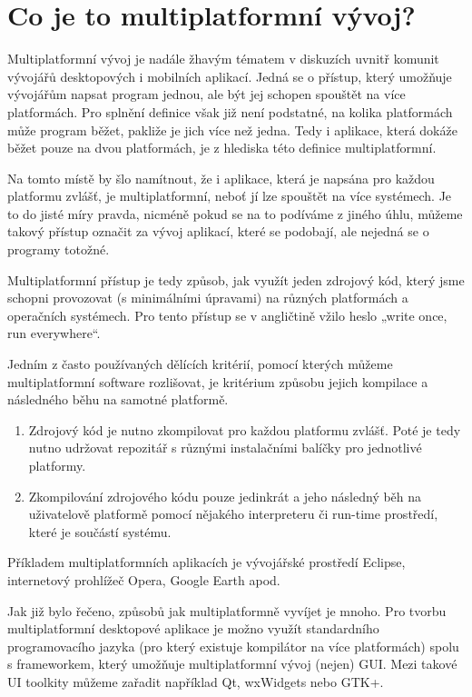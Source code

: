 \section{Co je to multiplatformní vývoj?}
Multiplatformní vývoj je nadále žhavým tématem v diskuzích uvnitř komunit vývojářů desktopových i mobilních aplikací. Jedná se o přístup, který umožňuje vývojářům napsat program jednou, ale být jej schopen spouštět na více platformách. Pro splnění definice však již není podstatné, na kolika platformách může program běžet, pakliže je jich více než jedna. Tedy i aplikace, která dokáže běžet pouze na dvou platformách, je z hlediska této definice multiplatformní.

Na tomto místě by šlo namítnout, že i aplikace, která je napsána pro každou platformu zvlášť, je multiplatformní, neboť jí lze spouštět na více systémech. Je to do jisté míry pravda, nicméně pokud se na to podíváme z jiného úhlu, můžeme takový přístup označit za vývoj aplikací, které se podobají, ale nejedná se o programy totožné.

Multiplatformní přístup je tedy způsob, jak využít jeden zdrojový kód, který jsme schopni provozovat (s minimálními úpravami) na různých platformách a operačních systémech. Pro tento přístup se v angličtině vžilo heslo „write once, run everywhere“. 

Jedním z často používaných dělících kritérií, pomocí kterých můžeme multiplatformní software rozlišovat, je kritérium způsobu jejich kompilace a následného běhu na samotné platformě.

\begin{enumerate}
	\item Zdrojový kód je nutno zkompilovat pro každou platformu zvlášť. Poté je tedy nutno udržovat repozitář s různými instalačními balíčky pro jednotlivé platformy.
	\item Zkompilování zdrojového kódu pouze jedinkrát a jeho následný běh na uživatelově platformě pomocí nějakého interpreteru či run-time prostředí, které je součástí systému.
\end{enumerate}

Příkladem multiplatformních aplikacích je  vývojářské prostředí Eclipse, internetový prohlížeč Opera, Google Earth apod.

Jak již bylo řečeno, způsobů jak multiplatformně vyvíjet je mnoho. Pro tvorbu multiplatformní desktopové aplikace je možno využít standardního programovacího jazyka (pro který existuje kompilátor na více platformách) spolu s frameworkem, který umožňuje multiplatformní vývoj (nejen) GUI. Mezi takové UI toolkity můžeme zařadit například Qt, wxWidgets nebo GTK+. 

